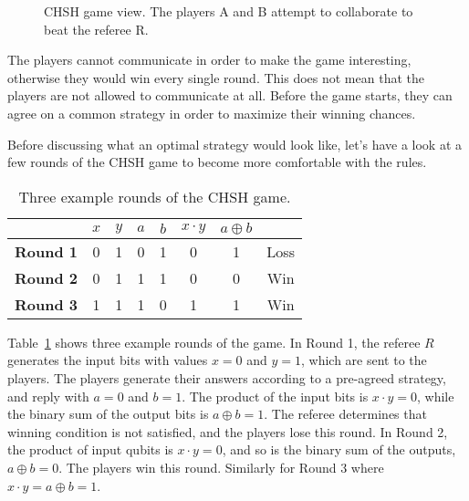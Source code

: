 \begin{figure}[t]
    \centering
    
    \caption[CHSH game.]{CHSH game view. The players A and B attempt to collaborate to beat the referee R.}
    \label{fig:chsh-game}
\end{figure}

The players cannot communicate in order to make the game interesting, otherwise they would win every single round.
This does not mean that the players are not allowed to communicate at all.
Before the game starts, they can agree on a common strategy in order to maximize their winning chances.

Before discussing what an optimal strategy would look like, let's have a look at a few rounds of the CHSH game to become more comfortable with the rules.
\begin{table}[h]
    \setcellgapes{5pt}
    \renewcommand\theadfont{}
    \makegapedcells
    \centering
    \begin{tabular}{cccccccc}
        \hline
        & $x$ & $y$ & $a$ & $b$ & $x\cdot y$ & $a\oplus b$ \\
        \hline
        \textbf{Round 1} & 0 & 1 & 0 & 1 & 0 & 1 & \textcolor{myred}{Loss} \\
        \textbf{Round 2} & 0 & 1 & 1 & 1 & 0 & 0 & \textcolor{mygreen}{Win} \\
        \textbf{Round 3} & 1 & 1 & 1 & 0 & 1 & 1 & \textcolor{mygreen}{Win} \\
        \hline
    \end{tabular}
    \caption[CHSH game example.]{Three example rounds of the CHSH game.}
    \label{tab:4-1_chsh_rounds}
\end{table}
Table~\ref{tab:4-1_chsh_rounds} shows three example rounds of the game.
In Round 1, the referee $R$ generates the input bits with values $x=0$ and $y=1$, which are sent to the players.
The players generate their answers according to a pre-agreed strategy, and reply with $a=0$ and $b=1$.
The product of the input bits is $x\cdot y=0$, while the binary sum of the output bits is $a\oplus b=1$.
The referee determines that winning condition is not satisfied, and the players lose this round.
In Round 2, the product of input qubits is $x\cdot y=0$, and so is the binary sum of the outputs, $a\oplus b=0$. The players win this round.
Similarly for Round 3 where $x\cdot y=a\oplus b=1$.

